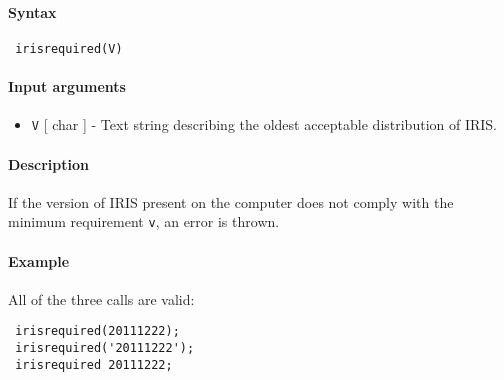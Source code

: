 


	\paragraph{Syntax}
 
 \begin{verbatim}
 irisrequired(V)
 \end{verbatim}
 
 \paragraph{Input arguments}
 
 \begin{itemize}
 \item
   \texttt{V} {[} char {]} - Text string describing the oldest acceptable
   distribution of IRIS.
 \end{itemize}
 
 \paragraph{Description}
 
 If the version of IRIS present on the computer does not comply with the
 minimum requirement \texttt{v}, an error is thrown.
 
 \paragraph{Example}
 
 All of the three calls are valid:
 
 \begin{verbatim}
 irisrequired(20111222);
 irisrequired('20111222');
 irisrequired 20111222;
 \end{verbatim}


